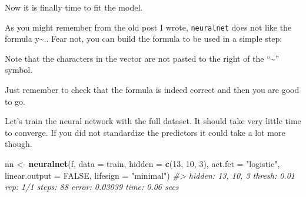 \documentclass[]{book}
\newenvironment{Shaded}{\begin{snugshade}}{\end{snugshade}}
\newcommand{\CommentTok}[1]{\textcolor[rgb]{0.56,0.35,0.01}{\textit{#1}}}
\newcommand{\DataTypeTok}[1]{\textcolor[rgb]{0.13,0.29,0.53}{#1}}
\newcommand{\DecValTok}[1]{\textcolor[rgb]{0.00,0.00,0.81}{#1}}
\newcommand{\KeywordTok}[1]{\textcolor[rgb]{0.13,0.29,0.53}{\textbf{#1}}}
\newcommand{\NormalTok}[1]{#1}
\newcommand{\OperatorTok}[1]{\textcolor[rgb]{0.81,0.36,0.00}{\textbf{#1}}}
\newcommand{\OtherTok}[1]{\textcolor[rgb]{0.56,0.35,0.01}{#1}}
\newcommand{\StringTok}[1]{\textcolor[rgb]{0.31,0.60,0.02}{#1}}
\begin{document}
Now it is finally time to fit the model.

As you might remember from the old post I wrote, \texttt{neuralnet} does not like the formula y\textasciitilde{}.. Fear not, you can build the formula to be used in a simple step:

\begin{Shaded}
\end{Shaded}

Note that the characters in the vector are not pasted to the right of the ``\textasciitilde{}'' symbol.

Just remember to check that the formula is indeed correct and then you are good to go.

Let's train the neural network with the full dataset. It should take very little time to converge. If you did not standardize the predictors it could take a lot more though.

\begin{Shaded}
\begin{Highlighting}[]
\NormalTok{nn <-}\StringTok{ }\KeywordTok{neuralnet}\NormalTok{(f,}
                \DataTypeTok{data =}\NormalTok{ train,}
                \DataTypeTok{hidden =} \KeywordTok{c}\NormalTok{(}\DecValTok{13}\NormalTok{, }\DecValTok{10}\NormalTok{, }\DecValTok{3}\NormalTok{),}
                \DataTypeTok{act.fct =} \StringTok{"logistic"}\NormalTok{,}
                \DataTypeTok{linear.output =} \OtherTok{FALSE}\NormalTok{,}
                \DataTypeTok{lifesign =} \StringTok{"minimal"}\NormalTok{)}
\CommentTok{#> hidden: 13, 10, 3    thresh: 0.01    rep: 1/1    steps:      88  error: 0.03039  time: 0.06 secs}
\end{Highlighting}
\end{Shaded}
\end{document}

